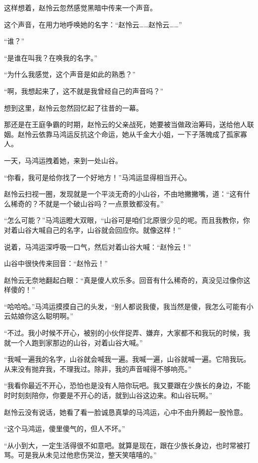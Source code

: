
\begin{this_body}

这样想着，赵怜云忽然感觉黑暗中传来一个声音。

这个声音，在用力地呼唤她的名字：“赵怜云……赵怜云……”

“谁？”

“是谁在叫我？在唤我的名字。”

“为什么我感觉，这个声音是如此的熟悉？”

“啊，我想起来了，这不就是我曾经自己的声音吗？”

想到这里，赵怜云忽然回忆起了往昔的一幕。

那还是在王庭争霸的时期，赵怜云的父亲战死，她要被当做政治筹码，送给他人联姻。赵怜云依靠马鸿运反抗这个命运，她从千金大小姐，一下子落魄成了孤家寡人。

一天，马鸿运拽着她，来到一处山谷。

“你看，我可是给你找了一个好地方！”马鸿运显得相当开心。

赵怜云扫视一圈，发现就是一个平淡无奇的小山谷，不由地撇撇嘴，道：“这有什么稀奇的？不就是一个破山谷吗？一点景致都没有。”

“怎么可能？”马鸿运瞪大双眼，“山谷可是咱们北原很少见的呢。而且我教你，你对着山谷大喊自己的名字，山谷就会回应你。就像这样！”

说着，马鸿运深呼吸一口气，然后对着山谷大喊：“赵怜云！”

山谷中很快传来回音：“赵怜云！”

赵怜云无奈地翻起白眼：“真是傻人欢乐多。回音有什么稀奇的，真没见过像你这样傻的！”

“哈哈哈。”马鸿运摸摸自己的头发，“别人都说我傻，我当然是傻，我怎么可能有小云姑娘你这么聪明啊。”

“不过。我小时候不开心，被别的小伙伴捉弄、嫌弃，大家都不和我玩的时候，我就一个人跑到家那边的山谷，对着山谷大喊。”

“我喊一遍我的名字，山谷就会喊我一遍。我喊一遍，山谷就喊一遍。它陪我玩。从来没有抛弃我，不理我过。除非，我的声音喊得不够响亮。”

“我看你最近不开心，恐怕也是没有人陪你玩吧。我又要跟在少族长的身边，不能时时刻刻陪你，你要是不开心的话，就到山谷这边来。和山谷玩啊。”

赵怜云没有说话，她看了看一脸诚恳真挚的马鸿运，心中不由升腾起一股怜意。

“这个马鸿运，傻里傻气的，但人不坏。”

“从小到大，一定生活得很不如意吧。就算是现在，跟在少族长身边，也时常被打骂。可是我从未见过他悲伤哭泣，整天笑嘻嘻的。”


\end{this_body}
